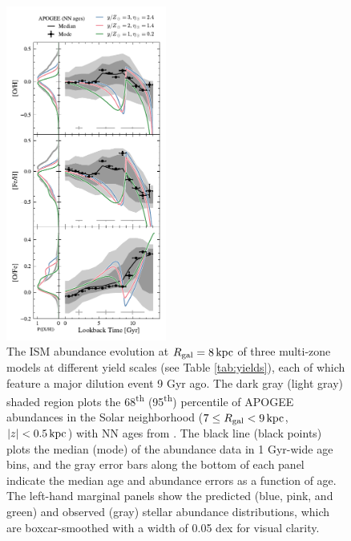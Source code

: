 \documentclass[twocolumn,twocolappendix,linenumbers]{aastex631}
\newcommand{\kpc}{\,{\rm kpc}}
\newcommand{\onecolumn}{0.47\textwidth}
\begin{document}
\begin{figure}
    \centering
    \includegraphics[width=\onecolumn]{figures/gas_abundance_evolution.pdf}
    \caption{The ISM abundance evolution at $R_{\rm gal}=8\kpc$ of three multi-zone models at different yield scales (see Table \ref{tab:yields}), each of which feature a major dilution event 9 Gyr ago. The dark gray (light gray) shaded region plots the 68\textsuperscript{th} (95\textsuperscript{th}) percentile of APOGEE abundances in the Solar neighborhood ($7\leq R_{\rm gal}<9\kpc$, $|z|<0.5\kpc$) with NN ages from \citet{leung_variational_2023}. The black line (black points) plots the median (mode) of the abundance data in 1 Gyr-wide age bins, and the gray error bars along the bottom of each panel indicate the median age and abundance errors as a function of age. The left-hand marginal panels show the predicted (blue, pink, and green) and observed (gray) stellar abundance distributions, which are boxcar-smoothed with a width of 0.05 dex for visual clarity.
}
\end{figure}
\end{document}
